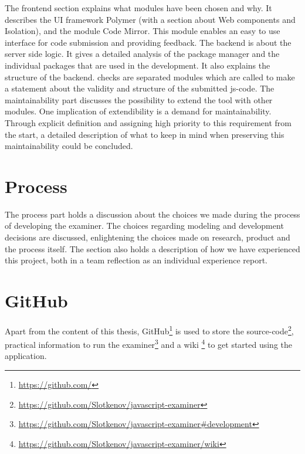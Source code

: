 The frontend section explains what modules have been chosen and why.
It describes the UI framework Polymer (with a section about Web components and
Isolation), and the module Code Mirror. This module enables an easy to use 
interface for code submission and providing feedback.
The backend is about the server side logic. It gives a detailed analysis of the
package manager and the individual packages that are used
in the development. It also explains the structure of the backend.
\Glspl{check} are separated modules which are called to make a statement
about the validity and structure of the submitted \gls{js-code}.
The maintainability part discusses the possibility to extend the tool with other 
modules. One implication of extendibility is a demand for maintainability. 
Through explicit definition and assigning high priority to this requirement from 
the start, a detailed description of what to keep in mind when 
preserving this maintainability could be concluded.

\section{Process}

The process part holds a discussion about the choices we made
during the process of developing the \gls{examiner}. The choices regarding 
modeling and development decisions are discussed, enlightening the choices made
on research, product and the process itself. The section also holds a description
of how we have experienced this project, both in a team reflection as an 
individual experience report.



\section{GitHub}

Apart from the content of this thesis, 
GitHub\footnote{\url{https://github.com/}} is used to store the
\gls{source-code}\footnote{\url{https://github.com/Slotkenov/javascript-examiner}},
practical information to run the 
\gls{examiner}\footnote{\url{https://github.com/Slotkenov/javascript-examiner\#development}} 
and a wiki \footnote{\url{https://github.com/Slotkenov/javascript-examiner/wiki}}
to get started using the application.



